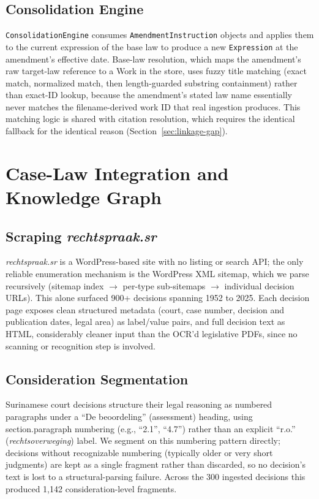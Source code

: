 \documentclass{IOS-Book-Article}
\begin{document}
\subsection{Consolidation Engine}

\texttt{ConsolidationEngine} consumes \texttt{AmendmentInstruction} objects and applies them to the current
expression of the base law to produce a new \texttt{Expression} at the amendment's effective date.
Base-law resolution, which maps the amendment's raw target-law reference to a Work in the
store, uses fuzzy title matching (exact match, normalized match, then length-guarded
substring containment) rather than exact-ID lookup, because the amendment's stated law name
essentially never matches the filename-derived work ID that real ingestion produces. This
matching logic is shared with citation resolution, which requires the identical fallback for
the identical reason (Section~\ref{sec:linkage-gap}).

\section{Case-Law Integration and Knowledge Graph}
\label{sec:caselaw}

\subsection{Scraping \emph{rechtspraak.sr}}
\label{sec:caselaw-scraping}

\emph{rechtspraak.sr} is a WordPress-based site with no listing or search API; the only reliable
enumeration mechanism is the WordPress XML sitemap, which we parse recursively (sitemap
index $\rightarrow$ per-type sub-sitemaps $\rightarrow$ individual decision URLs). This alone surfaced 900+
decisions spanning 1952 to 2025. Each decision page exposes clean structured metadata (court,
case number, decision and publication dates, legal area) as label/value pairs, and full
decision text as HTML, considerably cleaner input than the OCR'd legislative PDFs, since
no scanning or recognition step is involved.

\subsection{Consideration Segmentation}

Surinamese court decisions structure their legal reasoning as numbered paragraphs under a
``De beoordeling'' (assessment) heading, using section.paragraph numbering (e.g., ``2.1'', ``4.7'')
rather than an explicit ``r.o.'' (\emph{rechtsoverweging}) label. We segment on this numbering
pattern directly; decisions without recognizable numbering (typically older or very short
judgments) are kept as a single fragment rather than discarded, so no decision's text is
lost to a structural-parsing failure. Across the 300 ingested decisions this produced 1,142
consideration-level fragments.
\end{document}
